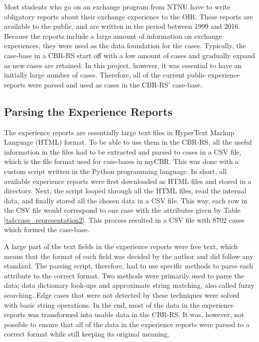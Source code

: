 Most students who go on an exchange program from NTNU have to write obligatory reports about their exchange experience to the OIR. These reports are available to the public, and are written in the period between 1999 and 2016. Because the reports include a large amount of information on exchange experiences, they were used as the data foundation for the cases. Typically, the case-base in a CBR-RS start off with a low amount of cases and gradually expand as new cases are retained. In this project, however, it was essential to have an initially large number of cases. Therefore, all of the current public experience reports were parsed and used as cases in the CBR-RS' case-base. 

\subsection{Parsing the Experience Reports}\label{sec:parsing_experience_reports}

The experience reports are essentially large text files in HyperText Markup Language (HTML) format. To be able to use them in the CBR-RS, all the useful information in the files had to be extracted and parsed to cases in a CSV file, which is the file format used for case-bases in myCBR. This was done with a custom script written in the Python programming language. In short, all available experience reports were first downloaded as HTML files and stored in a directory. Next, the script looped through all the HTML files, read the internal data, and finally stored all the chosen data in a CSV file. This way, each row in the CSV file would correspond to one case with the attributes given by Table \ref{tab:case_representation2}. This process resulted in a CSV file with 8702 cases which formed the case-base.

A large part of the text fields in the experience reports were free text, which means that the format of each field was decided by the author and did follow any standard. The parsing script, therefore, had to use specific methods to parse each attribute to the correct format. Two methods were primarily used to parse the data; data dictionary look-ups and approximate string matching, also called fuzzy searching. Edge cases that were not detected by these techniques were solved with basic string operations. In the end, most of the data in the experience reports was transformed into usable data in the CBR-RS. It was, however, not possible to ensure that all of the data in the experience reports were parsed to a correct format while still keeping its original meaning.


